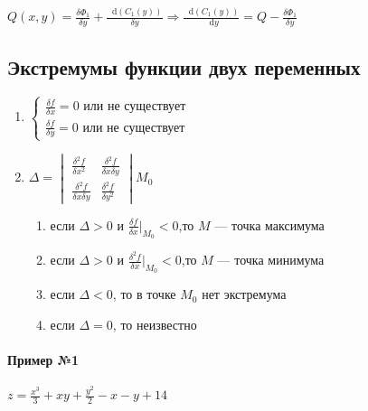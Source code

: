 \documentclass{article}
\newcommand*\diff{\mathop{}\!\mathrm{d}}
\begin{document}
$Q (x, y) = \frac{\delta \Phi_1}{\delta y} + \frac{\diff (C_1 (y))}{\delta y} \Longrightarrow \frac{\diff (C_1 (y))}{\diff y} = Q - \frac{\delta \Phi_1}{\delta y}$

\subsection{Экстремумы функции двух переменных}

\begin{enumerate}
    \item $\begin{cases}
        \frac{\delta f}{\delta x} = 0  \text{ или не существует }\\
        \frac{\delta f}{\delta y} = 0 \text{ или не существует }
    \end{cases}$
    \item $\Delta = \begin{vmatrix}
            \frac{\delta^2 f}{\delta x^2} & \frac{\delta^2 f}{\delta x \delta y} \\
            \frac{\delta^2 f}{\delta x \delta y} & \frac{\delta^2 f}{\delta y^2}
        \end{vmatrix} M_0
    $
    \begin{enumerate}
        \item если $\Delta > 0$ и $\frac{\delta f}{\delta x} \bigg|_{M_0} < 0$,то $M$ — точка максимума
        \item если $\Delta > 0$ и $\frac{\delta^2 f}{\delta x} \bigg|_{M_0} < 0$,то $M$ — точка минимума
        \item если $\Delta < 0$, то в точке $M_0$ нет экстремума
        \item если $\Delta = 0$, то неизвестно
    \end{enumerate}
\end{enumerate}

\paragraph{Пример №1}

$z = \frac{x^3}{3} + x y + \frac{y^2}{2} - x - y + 14$
\end{document}
